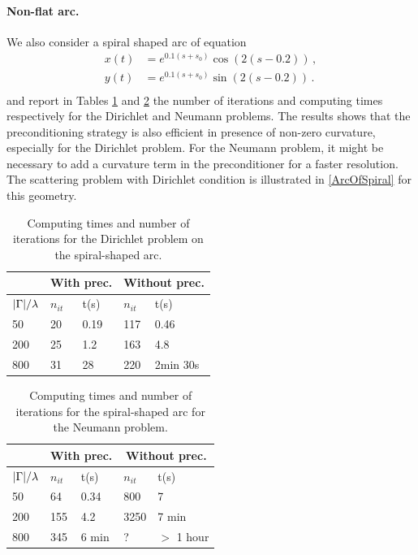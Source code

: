\documentclass[a4paper]{article}
\begin{document}
\paragraph{Non-flat arc.} We also consider a spiral shaped arc of equation \[\begin{split}
x(t) &= e^{ 0.1 (s + s_0)} \cos(2(s - 0.2))\,,\\
y(t) &= e^{ 0.1 (s + s_0)} \sin(2(s - 0.2))\,.\\
\end{split}\] 
and report in Tables \ref{SpiralDir} and \ref{SpiralNeu} the number of iterations and computing times respectively for the Dirichlet and Neumann problems. The results shows that the preconditioning strategy is also efficient in presence of non-zero curvature, especially for the Dirichlet problem. For the Neumann problem, it might be necessary to add a curvature term in the preconditioner for a faster resolution. The scattering problem with Dirichlet condition is illustrated in \autoref{ArcOfSpiral} for this geometry. 
\begin{table}[H]
	\begin{center}
		\begin{tabular}{m{4em} | m{4em} | m{4em} | m{4em} | m{4em}} 
			\hline
			\multicolumn{1}{c|}{ }&
			\multicolumn{2}{c|}{With prec.}&\multicolumn{2}{c}{Without prec.}\\
			\hline
			${\left\lvert \Gamma \right\rvert}/{\lambda}$ & $n_{it}$& t(s) & $n_{it}$ & t(s)\\
			\hline\hline
			50 & 20 & 0.19 & 117 & 0.46\\
			\hline
			200 & 25 & 1.2 & 163 &  4.8\\
			\hline
			800 & 31 & 28 & 220 &  2min 30s\\
			\hline
		\end{tabular}
	\end{center}
	\caption{Computing times and number of iterations for the Dirichlet problem on the spiral-shaped arc.}
	\label{SpiralDir}
\end{table}
\begin{table}[H]
	\begin{center}
		\begin{tabular}{m{4em} | m{4em} | m{4em} | m{4em} | m{4em}} 
			\hline
			\multicolumn{1}{c|}{ }&
			\multicolumn{2}{c|}{With prec.}&\multicolumn{2}{c}{Without prec.}\\
			\hline
			${\left\lvert \Gamma \right\rvert}/{\lambda}$ & $n_{it}$& t(s) & $n_{it}$ & t(s)\\
			\hline\hline
			50 & 64 & 0.34 & 800 & 7\\
			\hline
			200 & 155 & 4.2 & 3250 & 7 min \\
			\hline
			800 &  345 &  6 min &  ? & $>$ 1 hour \\
			\hline
		\end{tabular}
	\end{center}
	\caption{Computing times and number of iterations for the spiral-shaped arc for the Neumann problem. }
	\label{SpiralNeu}
\end{table}
\end{document}
